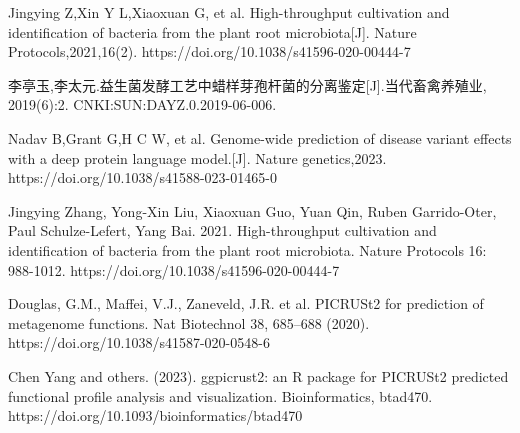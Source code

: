 \documentclass[UTF8]{ctexart}
\begin{document}

         



    \begin{thebibliography}{99}
         Jingying Z,Xin Y L,Xiaoxuan G, et al. High-throughput cultivation and identification of bacteria from the plant root microbiota[J]. Nature Protocols,2021,16(2). https://doi.org/10.1038/s41596-020-00444-7

         李亭玉,李太元.益生菌发酵工艺中蜡样芽孢杆菌的分离鉴定[J].当代畜禽养殖业, 2019(6):2. CNKI:SUN:DAYZ.0.2019-06-006.
 
         Nadav B,Grant G,H C W, et al. Genome-wide prediction of disease variant effects with a deep protein language model.[J]. Nature genetics,2023. https://doi.org/10.1038/s41588-023-01465-0

         Jingying Zhang, Yong-Xin Liu, Xiaoxuan Guo, Yuan Qin, Ruben Garrido-Oter, Paul Schulze-Lefert, Yang Bai. 2021. High-throughput cultivation  and identification of bacteria from the plant root microbiota. Nature Protocols 16: 988-1012. https://doi.org/10.1038/s41596-020-00444-7

         Douglas, G.M., Maffei, V.J., Zaneveld, J.R. et al. PICRUSt2 for prediction of metagenome functions. Nat Biotechnol 38, 685–688 (2020). https://doi.org/10.1038/s41587-020-0548-6

         Chen Yang and others. (2023). ggpicrust2: an R package for PICRUSt2 predicted functional profile analysis and visualization. Bioinformatics, btad470. https://doi.org/10.1093/bioinformatics/btad470

        \bibitem{}
    \end{thebibliography}
\end{document}
